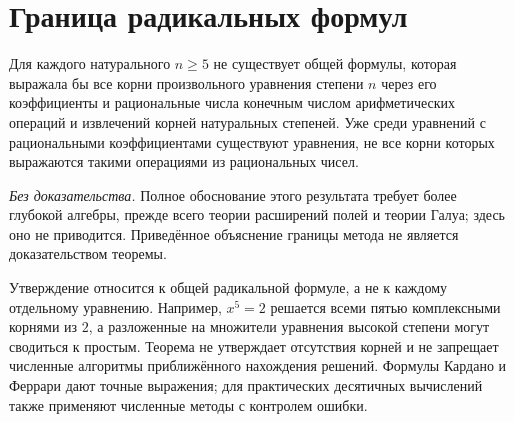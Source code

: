 \section{Граница радикальных формул}

\begin{theorem}\label{thm:legacy-c23-14}
Для каждого натурального \(n\ge5\) не существует общей формулы, которая выражала бы все корни произвольного уравнения степени \(n\) через его коэффициенты и рациональные числа конечным числом арифметических операций и извлечений корней натуральных степеней. Уже среди уравнений с рациональными коэффициентами существуют уравнения, не все корни которых выражаются такими операциями из рациональных чисел.
\end{theorem}

\textit{Без доказательства.} Полное обоснование этого результата требует более глубокой алгебры, прежде всего теории расширений полей и теории Галуа; здесь оно не приводится. Приведённое объяснение границы метода не является доказательством теоремы.

Утверждение относится к общей радикальной формуле, а не к каждому отдельному уравнению. Например, \(x^5=2\) решается всеми пятью комплексными корнями из \(2\), а разложенные на множители уравнения высокой степени могут сводиться к простым. Теорема не утверждает отсутствия корней и не запрещает численные алгоритмы приближённого нахождения решений. Формулы Кардано и Феррари дают точные выражения; для практических десятичных вычислений также применяют численные методы с контролем ошибки.

